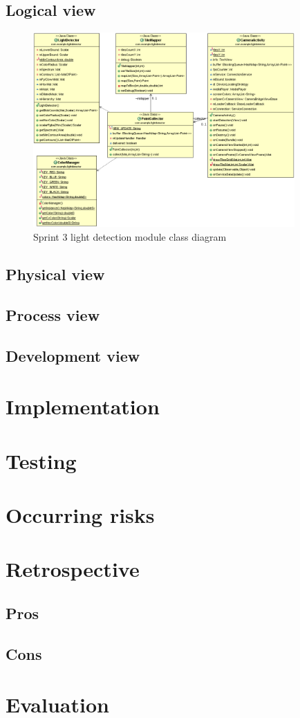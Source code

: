\subsection{Logical view}

\begin{figure}[H]
	\centering
		\includegraphics[width=10cm]{sprint3/sprint3.png}
	\caption{Sprint 3 light detection module class diagram}
	\label{fig:class_diagram_sprint3}
\end{figure}

\subsection{Physical view}
\subsection{Process view}
\subsection{Development view}

\section{Implementation}


\section{Testing}


\section{Occurring risks}
\section{Retrospective}
\subsection{Pros}
\subsection{Cons}
\section{Evaluation}